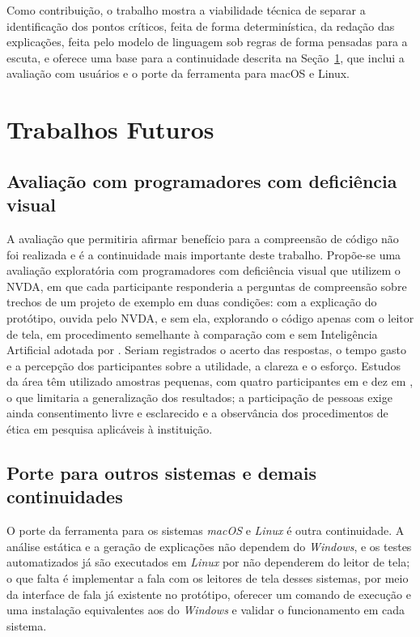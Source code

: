 \documentclass[
    12pt,                   %
    openright,              %
    oneside,                %
    a4paper,                %
    sumario=tradicional,    %
    english,                %
    brazil,                 %
    ]{abntex2}
\begin{document}
Como contribuição, o trabalho mostra a viabilidade técnica de separar a identificação dos pontos críticos, feita de forma determinística, da redação das explicações, feita pelo modelo de linguagem sob regras de forma pensadas para a escuta, e oferece uma base para a continuidade descrita na Seção~\ref{sec:futuros}, que inclui a avaliação com usuários e o porte da ferramenta para macOS e Linux.


\section{Trabalhos Futuros}\label{sec:futuros}

\subsection{Avaliação com programadores com deficiência visual}\label{sec:usuarios}

A avaliação que permitiria afirmar benefício para a compreensão de código não foi realizada e é a continuidade mais importante deste trabalho. Propõe-se uma avaliação exploratória com programadores com deficiência visual que utilizem o NVDA, em que cada participante responderia a perguntas de compreensão sobre trechos de um projeto de exemplo em duas condições: com a explicação do protótipo, ouvida pelo NVDA, e sem ela, explorando o código apenas com o leitor de tela, em procedimento semelhante à comparação com e sem Inteligência Artificial adotada por \textcite{latinoware34224}. Seriam registrados o acerto das respostas, o tempo gasto e a percepção dos participantes sobre a utilidade, a clareza e o esforço. Estudos da área têm utilizado amostras pequenas, com quatro participantes em \textcite{latinoware34224} e dez em \textcite{latinoware20457}, o que limitaria a generalização dos resultados; a participação de pessoas exige ainda consentimento livre e esclarecido e a observância dos procedimentos de ética em pesquisa aplicáveis à instituição.

\subsection{Porte para outros sistemas e demais continuidades}

O porte da ferramenta para os sistemas \textit{macOS} e \textit{Linux} é outra continuidade. A análise estática e a geração de explicações não dependem do \textit{Windows}, e os testes automatizados já são executados em \textit{Linux} por não dependerem do leitor de tela; o que falta é implementar a fala com os leitores de tela desses sistemas, por meio da interface de fala já existente no protótipo, oferecer um comando de execução e uma instalação equivalentes aos do \textit{Windows} e validar o funcionamento em cada sistema.
\end{document}
